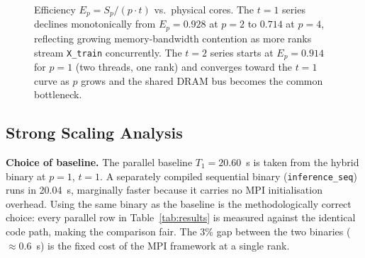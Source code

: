\documentclass[12pt,a4paper]{article}
\begin{document}
\begin{figure}[H]
  \centering
  \caption{Efficiency $E_p = S_p/(p{\cdot}t)$ vs.\ physical cores. The $t=1$ series
    declines monotonically from $E_p=0.928$ at $p=2$ to $0.714$ at $p=4$,
    reflecting growing memory-bandwidth contention as more ranks stream
    \texttt{X\_train} concurrently. The $t=2$ series starts at $E_p=0.914$
    for $p=1$ (two threads, one rank) and converges toward the $t=1$ curve
    as $p$ grows and the shared DRAM bus becomes the common bottleneck.}
  \label{fig:efficiency}
\end{figure}

\subsection{Strong Scaling Analysis}
\label{sec:analysis_strong}

\textbf{Choice of baseline.}
The parallel baseline $T_1 = 20.60$~s is taken from the hybrid binary at
$p=1$, $t=1$. A separately compiled sequential binary
(\texttt{inference\_seq}) runs in 20.04~s, marginally faster because it
carries no MPI initialisation overhead. Using the same binary as the baseline
is the methodologically correct choice: every parallel row in
Table~\ref{tab:results} is measured against the identical code path, making
the comparison fair. The 3\% gap between the two binaries ($\approx$0.6~s) is
the fixed cost of the MPI framework at a single rank.
\end{document}
